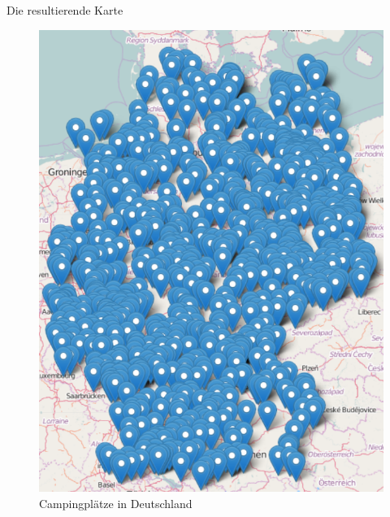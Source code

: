 \documentclass[ignorenonframetext,]{beamer}
\begin{document}
\begin{frame}{Die resultierende Karte}
\protect\hypertarget{die-resultierende-karte}{}

\begin{figure}
\centering
\includegraphics{figure/Germany_Campsites.PNG}
\caption{Campingplätze in Deutschland}
\end{figure}

\end{frame}
\end{document}
